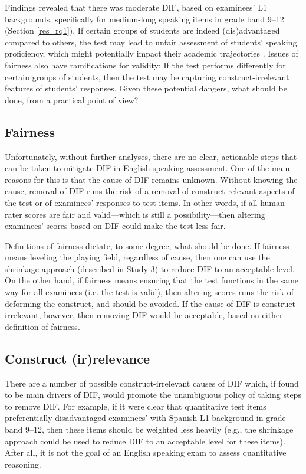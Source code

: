 \documentclass [PhD] {uclathes}
\begin{document}
Findings revealed that there was moderate DIF, based on examinees’ L1 backgrounds, specifically for medium-long speaking items in grade band 9–12 (Section \ref{res_rq1}). If certain groups of students are indeed (dis)advantaged compared to others, the test may lead to unfair assessment of students’ speaking proficiency, which might potentially impact their academic trajectories \citep{johnson2019effects}. Issues of fairness also have ramifications for validity: If the test performs differently for certain groups of students, then the test may be capturing construct-irrelevant features of students’ responses. Given these potential dangers, what should be done, from a practical point of view?

\subsection{Fairness}

Unfortunately, without further analyses, there are no clear, actionable steps that can be taken to mitigate DIF in English speaking assessment. One of the main reasons for this is that the cause of DIF remains unknown. Without knowing the cause, removal of DIF runs the risk of a removal of construct-relevant aspects of the test or of examinees’ responses to test items. In other words, if all human rater scores are fair and valid—which is still a possibility—then altering examinees’ scores based on DIF could make the test less fair. 

Definitions of fairness dictate, to some degree, what should be done. If fairness means leveling the playing field, regardless of cause, then one can use the shrinkage approach (described in Study 3) to reduce DIF to an acceptable level. On the other hand, if fairness means ensuring that the test functions in the same way for all examinees (i.e. the test is valid), then altering scores runs the risk of deforming the construct, and should be avoided. If the cause of DIF is construct-irrelevant, however, then removing DIF would be acceptable, based on either definition of fairness.

\subsection{Construct (ir)relevance}

There are a number of possible construct-irrelevant causes of DIF which, if found to be main drivers of DIF, would promote the unambiguous policy of taking steps to remove DIF. For example, if it were clear that quantitative test items preferentially disadvantaged examinees’ with Spanish L1 background in grade band 9–12, then these items should be weighted less heavily (e.g., the shrinkage approach could be used to reduce DIF to an acceptable level for these items). After all, it is not the goal of an English speaking exam to assess quantitative reasoning. 
\end{document}
